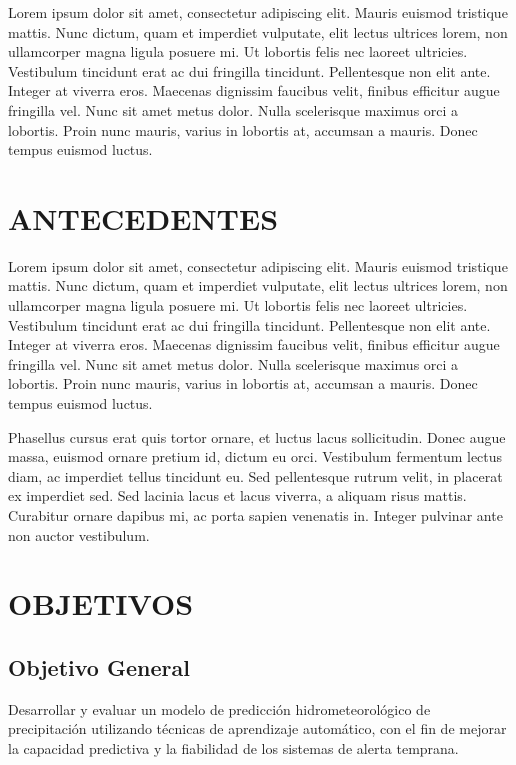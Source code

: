 \documentclass[stu, 12pt, helv, letterpaper, donotrepeattitle, floatsintext, natbib]{apa7}
\begin{document}
Lorem ipsum dolor sit amet, consectetur adipiscing elit. Mauris euismod tristique mattis. Nunc dictum, quam et imperdiet vulputate, elit lectus ultrices lorem, non ullamcorper magna ligula posuere mi. Ut lobortis felis nec laoreet ultricies. Vestibulum tincidunt erat ac dui fringilla tincidunt. Pellentesque non elit ante. Integer at viverra eros. Maecenas dignissim faucibus velit, finibus efficitur augue fringilla vel. Nunc sit amet metus dolor. Nulla scelerisque maximus orci a lobortis. Proin nunc mauris, varius in lobortis at, accumsan a mauris. Donec tempus euismod luctus.

\section*{ANTECEDENTES}

Lorem ipsum dolor sit amet, consectetur adipiscing elit. Mauris euismod tristique mattis. Nunc dictum, quam et imperdiet vulputate, elit lectus ultrices lorem, non ullamcorper magna ligula posuere mi. Ut lobortis felis nec laoreet ultricies. Vestibulum tincidunt erat ac dui fringilla tincidunt. Pellentesque non elit ante. Integer at viverra eros. Maecenas dignissim faucibus velit, finibus efficitur augue fringilla vel. Nunc sit amet metus dolor. Nulla scelerisque maximus orci a lobortis. Proin nunc mauris, varius in lobortis at, accumsan a mauris. Donec tempus euismod luctus.

Phasellus cursus erat quis tortor ornare, et luctus lacus sollicitudin. Donec augue massa, euismod ornare pretium id, dictum eu orci. Vestibulum fermentum lectus diam, ac imperdiet tellus tincidunt eu. Sed pellentesque rutrum velit, in placerat ex imperdiet sed. Sed lacinia lacus et lacus viverra, a aliquam risus mattis. Curabitur ornare dapibus mi, ac porta sapien venenatis in. Integer pulvinar ante non auctor vestibulum.


\section*{OBJETIVOS}

\subsection*{Objetivo General}

Desarrollar y evaluar un modelo de predicción hidrometeorológico de precipitación utilizando técnicas de aprendizaje automático, con el fin de mejorar la capacidad predictiva y la fiabilidad de los sistemas de alerta temprana.
\end{document}
